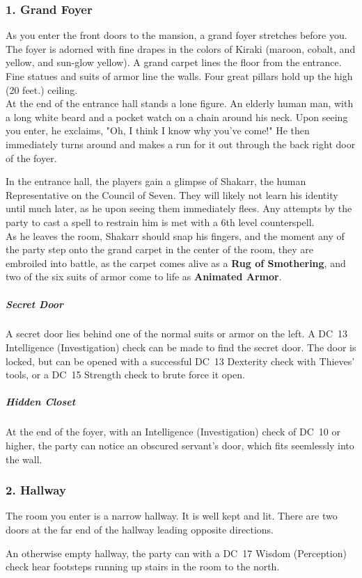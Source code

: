 \subsubsection{1. Grand Foyer}
\begin{DndReadAloud}
  As you enter the front doors to the mansion, a grand foyer stretches before you. The foyer is adorned with fine drapes in the colors of Kiraki (maroon, cobalt, and yellow, and sun-glow yellow). A grand carpet lines the floor from the entrance. Fine statues and suits of armor line the walls. Four great pillars hold up the high (20 feet.) ceiling.\\
  At the end of the entrance hall stands a lone figure. An elderly human man, with a long white beard and a pocket watch on a chain around his neck. Upon seeing you enter, he exclaims, "Oh, I think I know why you've come!" He then immediately turns around and makes a run for it out through the back right door of the foyer.
\end{DndReadAloud}
In the entrance hall, the players gain a glimpse of Shakarr, the human Representative on the Council of Seven. They will likely not learn his identity until much later, as he upon seeing them immediately flees. Any attempts by the party to cast a spell to restrain him is met with a 6th level counterspell.\\
As he leaves the room, Shakarr should snap his fingers, and the moment any of the party step onto the grand carpet in the center of the room, they are embroiled into battle, as the carpet comes alive as a \textbf{Rug of Smothering}, and two of the six suits of armor come to life as \textbf{Animated Armor}.\\
\subparagraph{Secret Door} A secret door lies behind one of the normal suits or armor on the left. A DC~13 Intelligence (Investigation) check can be made to find the secret door. The door is locked, but can be opened with a successful DC~13 Dexterity check with Thieves' tools, or a DC~15 Strength check to brute force it open.
\subparagraph{Hidden Closet} At the end of the foyer, with an Intelligence (Investigation) check of DC~10 or higher, the party can notice an obscured servant's door, which fits seemlessly into the wall.
\subsubsection{2. Hallway}
\begin{DndReadAloud}
  The room you enter is a narrow hallway. It is well kept and lit. There are two doors at the far end of the hallway leading opposite directions. 
\end{DndReadAloud}
An otherwise empty hallway, the party can with a DC~17 Wisdom (Perception) check hear footsteps running up stairs in the room to the north.
